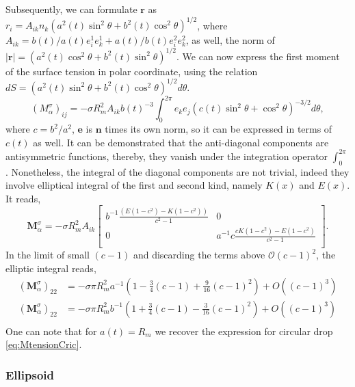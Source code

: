 Subsequently, we can formulate $\bm{r}$ as 
$r_i = A_{ik} n_k (a^2(t)\sin^2\theta+b^2(t)\cos^2\theta)^{1/2}$, 
where $A_{ik} =b(t)/a(t) e^1_ie^1_k+a(t)/b(t)e^2_ie^2_k$,
as well, the norm of $|\bm{r}| = (a^2(t)\cos^2\theta+b^2(t)\sin^2\theta)^{1/2}$.
We can now express the first moment of the surface tension in polar coordinate, using the relation 
$dS = (a^2(t)\sin^2\theta+b^2(t)\cos^2\theta)^{1/2}d\theta$.
\begin{equation*}
    (M_{\alpha}^\sigma)_{ij} 
    = - \sigma R_m^2 A_{ik} b(t)^{-3}\int_{0}^{2\pi}
    e_k  e_j 
    (c(t)\sin^2\theta+\cos^2\theta)^{-3/2} 
    d\theta,
\end{equation*}
where $c = b^2/a^2$, $\bm{e}$ is $\bm{n}$ times its own norm, so it can be expressed in terms of $c(t) $ as well. 
It can be demonstrated that the anti-diagonal components are antisymmetric functions, thereby, they vanish under the integration operator $\int_0^{2\pi}$. 
Nonetheless, the integral of the diagonal components are not trivial, indeed they involve elliptical integral of the first and second kind, namely $K(x)$ and $E(x)$. It reads,
\begin{equation*}
    \bm{M}_{\alpha}^\sigma
    = - \sigma R_m^2 A_{ik} \left[    
        \begin{matrix}
            b^{-1} \frac{(E(1 - c^2) - K(1 - c^2))}{c^2-1} & 0\\
            0 & a^{-1} c\frac{cK(1 - c^2) - E(1 - c^2)}{c^2-1}\\
        \end{matrix}
    \right].
\end{equation*}
In the limit of small $(c-1)$ and discarding the terms above $\mathcal{O}(c-1)^2$, the elliptic integral reads,
\begin{align*}
    (\bm{M}_{\alpha}^\sigma)_{22}
    &= - \sigma \pi R_m^2 
            a^{-1} (1 -\frac{3}{4}   (c-1)+\frac{9}{16}   (c-1)^2 )
    +O\left((c-1)^3\right)\\
    (\bm{M}_{\alpha}^\sigma)_{22}
    &= - \sigma \pi R_m^2 
            b^{-1} (1 +\frac{3}{4}   (c-1)-\frac{3}{16}   (c-1)^2)
    +O\left((c-1)^3\right)\\
    \label{eq:momentSigma}
\end{align*}
One can note that for $a(t) = R_m$ we recover the expression for circular drop \ref{eq:MtensionCric}.

\subsubsection*{Ellipsoid}

